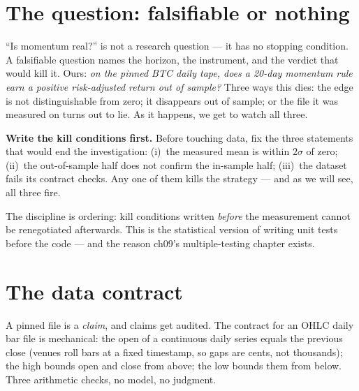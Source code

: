 \section{The question: falsifiable or nothing}\label{sec:question}

``Is momentum real?'' is not a research question --- it has no
stopping condition. A falsifiable question names the horizon,
the instrument, and the verdict that would kill it. Ours:
\emph{on the pinned BTC daily tape, does a 20-day momentum rule
earn a positive risk-adjusted return out of sample?} Three ways
this dies: the edge is not distinguishable from zero; it
disappears out of sample; or the file it was measured on turns
out to lie. As it happens, we get to watch all three.

\begin{example}\label{ex:falsifiable}
\textbf{Write the kill conditions first.} Before touching data,
fix the three statements that would end the investigation:
(i)~the measured mean is within $2\sigma$ of zero; (ii)~the
out-of-sample half does not confirm the in-sample half;
(iii)~the dataset fails its contract checks. Any one of them
kills the strategy --- and as we will see, all three fire.
\begin{solution}
The discipline is ordering: kill conditions written \emph{before}
the measurement cannot be renegotiated afterwards. This is the
statistical version of writing unit tests before the code --- and
the reason ch09's multiple-testing chapter exists.
\end{solution}
\end{example}

\section{The data contract}\label{sec:contract}

A pinned file is a \emph{claim}, and claims get audited. The
contract for an OHLC daily bar file is mechanical: the open of a
continuous daily series equals the previous close (venues roll
bars at a fixed timestamp, so gaps are cents, not thousands);
the high bounds open and close from above; the low bounds them
from below. Three arithmetic checks, no model, no judgment.

